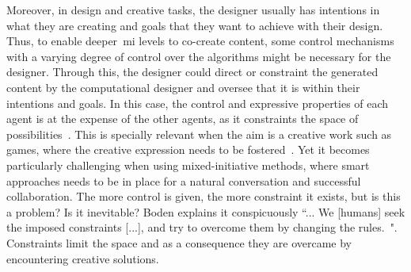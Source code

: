 

Moreover, in design and creative tasks, the designer usually has intentions in what they are creating and goals that they want to achieve with their design. Thus, to enable deeper~\acrshort{mi} levels to co-create content, some control mechanisms with a varying degree of control over the algorithms might be necessary for the designer. Through this, the designer could direct or constraint the generated content by the computational designer and oversee that it is within their intentions and goals. In this case, the control and expressive properties of each agent is at the expense of the other agents, as it constraints the space of possibilities~\cite{Baldwin2017}. This is specially relevant when the aim is a creative work such as games, where the creative expression needs to be fostered~\cite{Alvarez2018}. Yet it becomes particularly challenging when using mixed-initiative methods, where smart approaches needs to be in place for a natural conversation and successful collaboration. The more control is given, the more constraint it exists, but is this a problem? Is it inevitable? Boden explains it conspicuously ``...  We [humans] seek the imposed constraints [...], and try to overcome them by changing the rules.~\cite{boden2004-creative}". Constraints limit the space and as a consequence they are overcame by encountering creative solutions.


